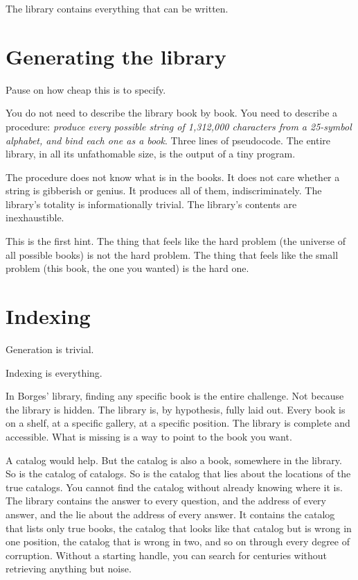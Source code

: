 The library contains everything that can be written.

\section*{Generating the library}

Pause on how cheap this is to specify.

You do not need to describe the library book by book. You need to describe a procedure: \emph{produce every possible string of 1,312,000 characters from a 25-symbol alphabet, and bind each one as a book}. Three lines of pseudocode. The entire library, in all its unfathomable size, is the output of a tiny program.

The procedure does not know what is in the books. It does not care whether a string is gibberish or genius. It produces all of them, indiscriminately. The library's totality is informationally trivial. The library's contents are inexhaustible.

This is the first hint. The thing that feels like the hard problem (the universe of all possible books) is not the hard problem. The thing that feels like the small problem (this book, the one you wanted) is the hard one.

\section*{Indexing}

Generation is trivial.

Indexing is everything.

In Borges' library, finding any specific book is the entire challenge. Not because the library is hidden. The library is, by hypothesis, fully laid out. Every book is on a shelf, at a specific gallery, at a specific position. The library is complete and accessible. What is missing is a way to point to the book you want.

A catalog would help. But the catalog is also a book, somewhere in the library. So is the catalog of catalogs. So is the catalog that lies about the locations of the true catalogs. You cannot find the catalog without already knowing where it is. The library contains the answer to every question, and the address of every answer, and the lie about the address of every answer. It contains the catalog that lists only true books, the catalog that looks like that catalog but is wrong in one position, the catalog that is wrong in two, and so on through every degree of corruption. Without a starting handle, you can search for centuries without retrieving anything but noise.

